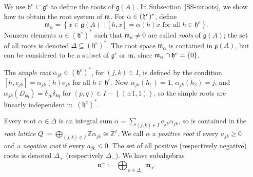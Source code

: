 \documentclass[11pt,letterpaper]{amsart}
\numberwithin{thecounter}{section}
\theoremstyle{definition}
\renewcommand{\a}{\alpha}
\newcommand{\Z}{{\mathbb Z}}
\newcommand{\nm}{{\mathfrak{n}^-}}
\newcommand{\npm}{{\mathfrak{n}^\pm}}
\begin{document}
We use $\mathfrak{h}^e\subseteq \mathfrak{g}^e$ to define the roots of $\mathfrak{g}(A)$.  In Subsection~\ref{SS-mroots}, we show
 how to obtain the  root system of $\frak m$.
For $\alpha \in (\frak h^e)^*$, define  
$$\mathfrak{m}_\alpha = \left\{x \in \mathfrak{g}(A)  \mid [h,x] = \alpha (h)x \mbox{ for all } h \in \mathfrak{h}^e \right\}.$$ 
Nonzero elements $\alpha \in (\mathfrak{h}^e)^*$ such that  $\mathfrak{m}_\alpha \neq 0$ are called \emph{roots} of $\mathfrak{g}(A)$; the set of all roots is denoted $\Delta\subseteq (\mathfrak{h}^e)^*$. 
The root space $\mathfrak{m}_{\a}$ is contained in $\mathfrak{g}(A)$, but can be considered to be a subset of $\mathfrak{g}^e$ or $\frak m$,
since $\mathfrak{m}_\a \cap \frak h ^e=\{0\}$. 


The {\em simple root} $\alpha_{jk} \in(\mathfrak{h}^e)^*$, for $(j,k)\in I$, is defined by the condition
$\left[h,e_{jk}\right]=\alpha_{jk}(h)e_{jk}$ for all $h \in \mathfrak{h}^e$.
Now $\alpha_{jk}(h_1)=1$, $\alpha_{jk}(h_2)=j$,
and $\alpha_{jk}(D_{pq})=\delta_{jp}\delta_{kq}$ for  $(p,q)\in I-\left\{(\pm1,1) \right\}$, so the simple roots are linearly independent in~$(\mathfrak{h}^e)^*$.

Every root $\a\in\Delta$ is an integral sum $\a=\sum_{(j,k)\in I} a_{jk}\a_{jk}$, so is contained in the 
\emph{root lattice}  $Q := \bigoplus_{(j,k)\in I}\Z\a_{jk}\cong \Z^I$.
We call $\a$ a \emph{positive root} if every $a_{jk}\ge0$ and  a \emph{negative root} if every $a_{jk}\le0$.
The set of all positive (respectively negative) roots is denoted $\Delta_+$ (respectively $\Delta_-$).  
We have subalgebras
$$ \npm:= \bigoplus_{\a\in\Delta_\pm} \mathfrak{m}_\alpha.$$
\end{document}
